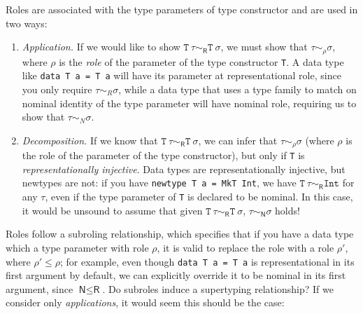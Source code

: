 Roles are associated with the type parameters of type constructor and
are used in two ways:

\begin{enumerate}
    \item \emph{Application.} If we would like to show $\texttt{T}~\tau \sim_\textsf{R}
    \texttt{T}~\sigma$, we must show that $\tau \sim_\rho \sigma$, where
    $\rho$ is the \emph{role} of the parameter of the type constructor
    \verb|T|.  A data type like \verb|data T a = T a| will have its parameter
    at representational role, since you only require $\tau \sim_R
    \sigma$, while a data type that uses a type family to match on
    nominal identity of the type parameter will have nominal role,
    requiring us to show that $\tau \sim_N \sigma$.

    \item \emph{Decomposition.}  If we know that $\texttt{T}~\tau \sim_\textsf{R}
    \texttt{T}~\sigma$, we can infer that $\tau \sim_\rho \sigma$ (where $\rho$
    is the role of the parameter of the type constructor),
    but only if \verb|T| is \emph{representationally injective}.  Data types
    are representationally injective, but newtypes are not: if you
    have \verb|newtype T a = MkT Int|,
    we have $\texttt{T}~\tau \sim_\textsf{R} \texttt{Int}$ for any $\tau$,
    even if the type parameter of \verb|T| is declared
    to be nominal.  In this case,
    it would be unsound to assume that given
    $\texttt{T}~\tau \sim_\textsf{R} \texttt{T}~\sigma$, $\tau \sim_\textsf{N} \sigma$ holds!
\end{enumerate}
%
Roles follow a subroling relationship, which specifies that if you have
a data type which a type parameter with role $\rho$, it is valid to
replace the role with a role $\rho'$, where $\rho' \le \rho$; for example,
even though \verb|data T a = T a| is representational in its first
argument by default, we can explicitly override it to be nominal in its
first argument, since $\textsf{N} \le \textsf{R}$.  Do subroles induce
a supertyping relationship?  If we consider only \emph{applications}, it would
seem this should be the case:

